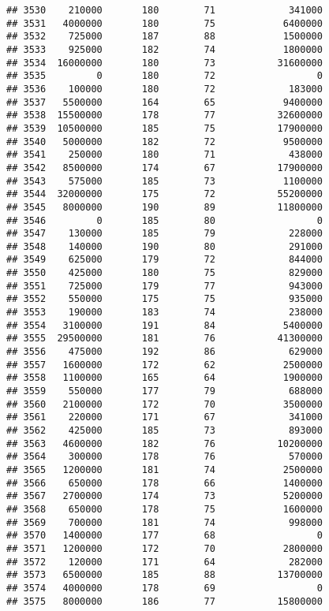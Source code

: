 \documentclass[
]{article}
\begin{document}
\begin{verbatim}
## 3530    210000       180        71             341000
## 3531   4000000       180        75            6400000
## 3532    725000       187        88            1500000
## 3533    925000       182        74            1800000
## 3534  16000000       180        73           31600000
## 3535         0       180        72                  0
## 3536    100000       180        72             183000
## 3537   5500000       164        65            9400000
## 3538  15500000       178        77           32600000
## 3539  10500000       185        75           17900000
## 3540   5000000       182        72            9500000
## 3541    250000       180        71             438000
## 3542   8500000       174        67           17900000
## 3543    575000       185        73            1100000
## 3544  32000000       175        72           55200000
## 3545   8000000       190        89           11800000
## 3546         0       185        80                  0
## 3547    130000       185        79             228000
## 3548    140000       190        80             291000
## 3549    625000       179        72             844000
## 3550    425000       180        75             829000
## 3551    725000       179        77             943000
## 3552    550000       175        75             935000
## 3553    190000       183        74             238000
## 3554   3100000       191        84            5400000
## 3555  29500000       181        76           41300000
## 3556    475000       192        86             629000
## 3557   1600000       172        62            2500000
## 3558   1100000       165        64            1900000
## 3559    550000       177        79             688000
## 3560   2100000       172        70            3500000
## 3561    220000       171        67             341000
## 3562    425000       185        73             893000
## 3563   4600000       182        76           10200000
## 3564    300000       178        76             570000
## 3565   1200000       181        74            2500000
## 3566    650000       178        66            1400000
## 3567   2700000       174        73            5200000
## 3568    650000       178        75            1600000
## 3569    700000       181        74             998000
## 3570   1400000       177        68                  0
## 3571   1200000       172        70            2800000
## 3572    120000       171        64             282000
## 3573   6500000       185        88           13700000
## 3574   4000000       178        69                  0
## 3575   8000000       186        77           15800000

\end{verbatim}
\end{document}
